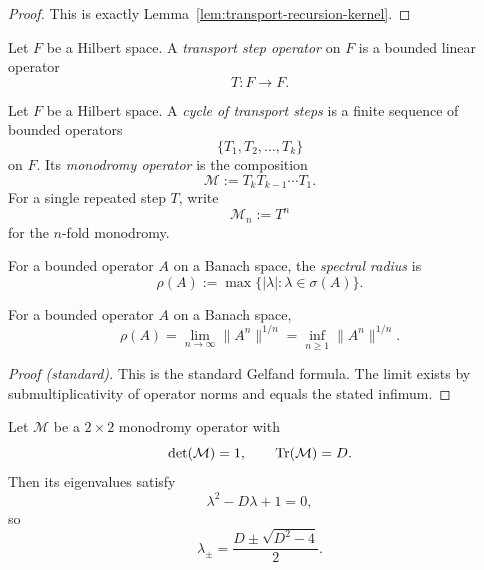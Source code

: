 \begin{proof}
This is exactly Lemma~\ref{lem:transport-recursion-kernel}.
\end{proof}

\begin{definition}
\label{def:transport-step}
Let $F$ be a Hilbert space. A \emph{transport step operator} on $F$ is a
bounded linear operator
\[
T:F\to F.
\]
\end{definition}

\begin{definition}
\label{def:transport-cycle}
Let $F$ be a Hilbert space. A \emph{cycle of transport steps} is a finite
sequence of bounded operators
\[
\{T_1,T_2,\dots,T_k\}
\]
on $F$. Its \emph{monodromy operator} is the composition
\[
\mathcal M:=T_kT_{k-1}\cdots T_1.
\]
For a single repeated step $T$, write
\[
\mathcal M_n:=T^n
\]
for the $n$-fold monodromy.
\end{definition}

\begin{definition}
\label{def:spectral-radius}
For a bounded operator $A$ on a Banach space, the \emph{spectral radius} is
\[
\rho(A):=\max\{|\lambda|:\lambda\in\sigma(A)\}.
\]
\end{definition}

\begin{lemma}
\label{lem:gelfand}
For a bounded operator $A$ on a Banach space,
\[
\rho(A)=\lim_{n\to\infty}\|A^n\|^{1/n}
=
\inf_{n\ge 1}\|A^n\|^{1/n}.
\]
\end{lemma}

\begin{proof}[Proof (standard)]
This is the standard Gelfand formula. The limit exists by
submultiplicativity of operator norms and equals the stated infimum.
\end{proof}

\begin{proposition}
\label{prop:monodromy-2x2}
Let $\mathcal M$ be a $2\times 2$ monodromy operator with
\[
\det(\mathcal M)=1,
\qquad
\mathrm{Tr}(\mathcal M)=D.
\]
Then its eigenvalues satisfy
\[
\lambda^2-D\lambda+1=0,
\]
so
\[
\lambda_\pm=\frac{D\pm\sqrt{D^2-4}}{2}.
\]
\end{proposition}

